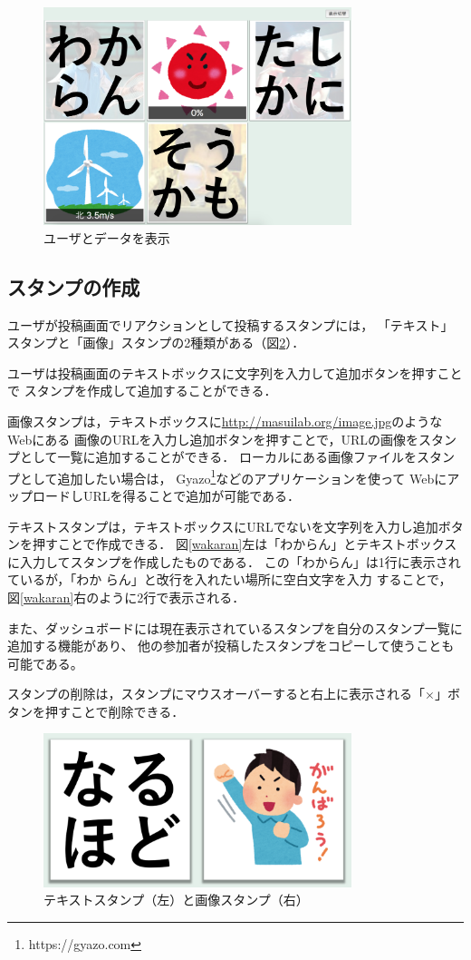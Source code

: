 \begin{figure}[H]
\centering
\includegraphics[width=9cm]{images/n_w_m_w_s.png}
\caption{ユーザとデータを表示}
\label{n_w_m_w_s}
\end{figure}

\subsection{スタンプの作成}
ユーザが投稿画面でリアクションとして投稿するスタンプには，
「テキスト」スタンプと「画像」スタンプの2種類がある（図\ref{stamp}）．

ユーザは投稿画面のテキストボックスに文字列を入力して追加ボタンを押すことで
スタンプを作成して追加することができる．

画像スタンプは，テキストボックスに\url{http://masuilab.org/image.jpg}のようなWebにある
画像のURLを入力し追加ボタンを押すことで，URLの画像をスタンプとして一覧に追加することができる．
ローカルにある画像ファイルをスタンプとして追加したい場合は，
Gyazo\footnote{https://gyazo.com}などのアプリケーションを使って
WebにアップロードしURLを得ることで追加が可能である．

テキストスタンプは，テキストボックスにURLでないを文字列を入力し追加ボタンを押すことで作成できる．
図\ref{wakaran}左は「わからん」とテキストボックスに入力してスタンプを作成したものである．
この「わからん」は1行に表示されているが，「わか らん」と改行を入れたい場所に空白文字を入力
することで，図\ref{wakaran}右のように2行で表示される．

また、ダッシュボードには現在表示されているスタンプを自分のスタンプ一覧に追加する機能があり、
他の参加者が投稿したスタンプをコピーして使うことも可能である。

スタンプの削除は，スタンプにマウスオーバーすると右上に表示される「×」ボタンを押すことで削除できる．

\begin{figure}[H]
\centering
\includegraphics[width=9cm]{images/stamp.png}
\caption{テキストスタンプ（左）と画像スタンプ（右）}
\label{stamp}
\end{figure}

